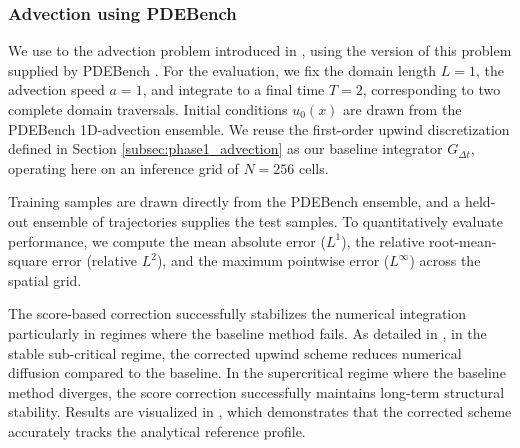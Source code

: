 \documentclass[letterpaper]{article} %
\begin{document}
\subsubsection{Advection using PDEBench}\label{sec:advection_pdebench}

We use to the advection problem introduced in , using the version of this problem supplied by PDEBench \citep{PDEBench2022}. For the evaluation, we fix the domain length $L = 1$, the advection speed $a = 1$, and integrate to a final time $T = 2$, corresponding to two complete domain traversals. Initial conditions $u_0(x)$ are drawn from the PDEBench 1D-advection ensemble.
We reuse the first-order upwind discretization defined  in Section \ref{subsec:phase1_advection} as our baseline integrator $G_{\Delta t}$, operating here on an inference grid of $N = 256$ cells. 


Training samples are drawn directly from the PDEBench ensemble,
and a held-out ensemble of trajectories supplies the test samples.
To quantitatively evaluate performance, we compute the mean absolute error ($L^1$), the relative root-mean-square error (relative $L^2$), and the maximum pointwise error ($L^\infty$) across the spatial grid.

The score-based correction successfully stabilizes the numerical integration particularly in regimes where the baseline method fails. As detailed in , in the stable sub-critical regime, the corrected upwind scheme  reduces numerical diffusion compared to the baseline. In the supercritical regime where the baseline method diverges, the score correction successfully maintains long-term structural stability. Results are visualized in , which demonstrates that the corrected scheme accurately tracks the analytical reference profile.
\end{document}
